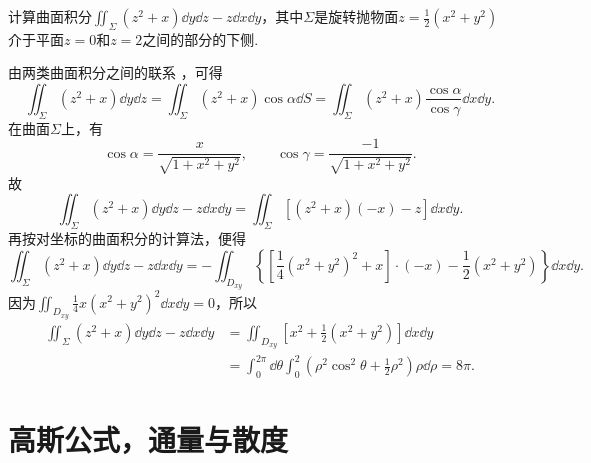 \begin{example}
\def\ys{\iint_{\Sigma} (z^2+x) \dd{y}\dd{z} - z \dd{x}\dd{y}}%
计算曲面积分\(\ys\)，其中\(\Sigma\)是旋转抛物面\(z = \frac{1}{2}(x^2+y^2)\)介于平面\(z=0\)和\(z=2\)之间的部分的下侧.
\begin{solution}
由两类曲面积分之间的联系 ，可得\[
\iint_{\Sigma} (z^2+x) \dd{y}\dd{z}
= \iint_{\Sigma} (z^2+x) \cos\alpha \dd{S}
= \iint_{\Sigma} (z^2+x) \frac{\cos\alpha}{\cos\gamma} \dd{x}\dd{y}.
\]在曲面\(\Sigma\)上，有\[
\cos\alpha
= \frac{x}{\sqrt{1+x^2+y^2}},
\qquad
\cos\gamma
= \frac{-1}{\sqrt{1+x^2+y^2}}.
\]故\[
\ys
= \iint_{\Sigma} [(z^2+x)(-x) - z] \dd{x}\dd{y}.
\]
再按对坐标的曲面积分的计算法，便得\[
\ys
= - \iint_{D_{xy}} \left\{
	\left[
		\frac{1}{4} (x^2+y^2)^2
		+ x
	\right] \cdot (-x)
	- \frac{1}{2} (x^2+y^2)
\right\} \dd{x}\dd{y}.
\]因为\(\iint_{D_{xy}} \frac{1}{4} x(x^2+y^2)^2 \dd{x}\dd{y} = 0\)，所以\begin{align*}
\ys
&= \iint_{D_{xy}} \left[x^2+\frac{1}{2}(x^2+y^2)\right] \dd{x}\dd{y} \\
&= \int_0^{2\pi} \dd{\theta} \int_0^2 \left(\rho^2 \cos^2\theta + \frac{1}{2} \rho^2\right) \rho \dd{\rho}
= 8\pi.
\end{align*}
\end{solution}
\end{example}

\section{高斯公式，通量与散度}
